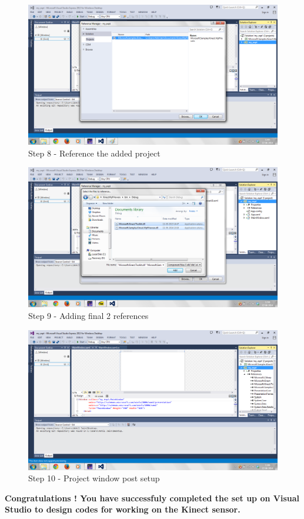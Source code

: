 \begin{flushleft}
\medskip
\begin{figure}
\begin{center}
\includegraphics[scale=0.5]{s8}
\end{center}
\caption{Step 8 - Reference the added project}
\label{fig:e8}
\end{figure}

\medskip
\begin{figure}
\begin{center}
\includegraphics[scale=0.5]{s9}
\end{center}
\caption{Step 9 - Adding final 2 references}
\label{fig:e9}
\end{figure}
\medskip
\begin{figure}
\begin{center}
\includegraphics[scale=0.5]{s10}
\end{center}
\caption{Step 10 - Project window post setup}
\label{fig:e10}
\end{figure}
\medskip
\Large{\textbf{Congratulations ! You have successfuly completed the set up on Visual Studio to design codes for working on the Kinect sensor.}}


\end{flushleft}


